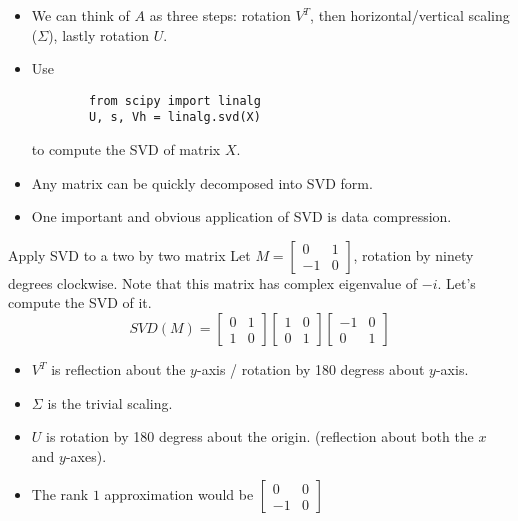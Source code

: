 \documentclass[../main]{subfiles}
\begin{document}
\begin{itemize}
    \item We can think of $A$ as three steps: rotation $V^T$, then horizontal/vertical scaling ($\Sigma$), lastly rotation $U$.
    \item Use \begin{verbatim}
        from scipy import linalg
        U, s, Vh = linalg.svd(X)
    \end{verbatim}
    to compute the SVD of matrix $X$.
    \item Any matrix can be quickly decomposed into SVD form.
    \item One important and obvious application of SVD is data compression.
\end{itemize}
\begin{pbox}{Apply SVD to a two by two matrix}
    Let $M = \begin{bmatrix}
        0 & 1\\
        -1 & 0
    \end{bmatrix}$, rotation by ninety degrees clockwise. Note that this matrix has complex eigenvalue of $-i$. Let's compute the SVD of it.
    \[
    SVD(M) = \begin{bmatrix}
        0 & 1\\
        1 & 0
    \end{bmatrix} \begin{bmatrix}
        1 & 0 \\
        0 & 1
    \end{bmatrix}
    \begin{bmatrix}
        -1 & 0 \\
        0 & 1
    \end{bmatrix}
    \]
    
    \begin{itemize}
        \item $V^T$ is reflection about the $y$-axis / rotation by 180 degress about $y$-axis.
        \item $\Sigma$ is the trivial scaling.
        \item $U$ is rotation by 180 degress about the origin. (reflection about both the $x$ and $y$-axes).
        \item The rank $1$ approximation would be $\begin{bmatrix}
            0 & 0\\
            -1 & 0
        \end{bmatrix}$
    \end{itemize}
\end{pbox}
\end{document}
